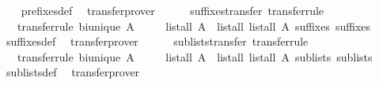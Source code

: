 \begin{isabellebody}
%
\isadelimproof
\ \ %
\endisadelimproof
%
\isatagproof
{}\isamarkupfalse%
\ prefixes{\isacharunderscore}def\ \isamarkupfalse%
\ transfer{\isacharunderscore}prover%
\endisatagproof
{\isafoldproof}%
%
\isadelimproof
\isanewline
%
\endisadelimproof
\ \ \ \ \isanewline
{}\isamarkupfalse%
\ suffixes{\isacharunderscore}transfer\ {\isacharbrackleft}transfer{\isacharunderscore}rule{\isacharbrackright}{\isacharcolon}\isanewline
\ \ \ {\isacharbrackleft}transfer{\isacharunderscore}rule{\isacharbrackright}{\isacharcolon}\ {\isachardoublequoteopen}bi{\isacharunderscore}unique\ A{\isachardoublequoteclose}\isanewline
\ \ \ \ \ {\isachardoublequoteopen}{\isacharparenleft}list{\isacharunderscore}all{}\ A\ {\isacharequal}{\isacharequal}{\isacharequal}{\isachargreater}\ list{\isacharunderscore}all{}\ {\isacharparenleft}list{\isacharunderscore}all{}\ A{\isacharparenright}{\isacharparenright}\ suffixes\ suffixes{\isachardoublequoteclose}\isanewline
%
\isadelimproof
\ \ %
\endisadelimproof
%
\isatagproof
{}\isamarkupfalse%
\ suffixes{\isacharunderscore}def\ \isamarkupfalse%
\ transfer{\isacharunderscore}prover%
\endisatagproof
{\isafoldproof}%
%
\isadelimproof
\isanewline
%
\endisadelimproof
\ \ \ \ \isanewline
{}\isamarkupfalse%
\ sublists{\isacharunderscore}transfer\ {\isacharbrackleft}transfer{\isacharunderscore}rule{\isacharbrackright}{\isacharcolon}\isanewline
\ \ \ {\isacharbrackleft}transfer{\isacharunderscore}rule{\isacharbrackright}{\isacharcolon}\ {\isachardoublequoteopen}bi{\isacharunderscore}unique\ A{\isachardoublequoteclose}\isanewline
\ \ \ \ \ {\isachardoublequoteopen}{\isacharparenleft}list{\isacharunderscore}all{}\ A\ {\isacharequal}{\isacharequal}{\isacharequal}{\isachargreater}\ list{\isacharunderscore}all{}\ {\isacharparenleft}list{\isacharunderscore}all{}\ A{\isacharparenright}{\isacharparenright}\ sublists\ sublists{\isachardoublequoteclose}\isanewline
%
\isadelimproof
\ \ %
\endisadelimproof
%
\isatagproof
{}\isamarkupfalse%
\ sublists{\isacharunderscore}def\ \isamarkupfalse%
\ transfer{\isacharunderscore}prover%
\endisatagproof
{\isafoldproof}%
%
\isadelimproof
\isanewline
%
\endisadelimproof
\isanewline
{}\isamarkupfalse%
\isanewline
%
\isadelimtheory
\isanewline
%
\endisadelimtheory
%
\isatagtheory
{}\isamarkupfalse%
%
\endisatagtheory
{\isafoldtheory}%
%
\isadelimtheory
%
\endisadelimtheory
%
\end{isabellebody}%
